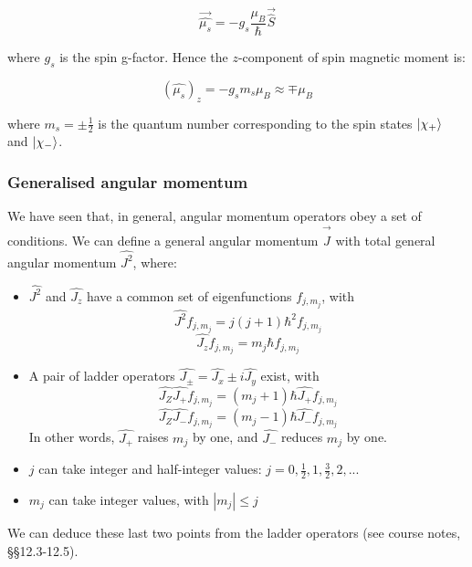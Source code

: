 \[ \vec{\hat{\mu_s}} = -g_s \frac{\mu_B}{\hbar} \vec{\hat{S}} \]

where $g_s$ is the spin g-factor. Hence the $z$-component of spin magnetic moment is:

\[ (\hat{\mu_s})_z = -g_s m_s \mu_B  \approx \mp \mu_B \]

where $m_s = \pm\frac{1}{2}$ is the quantum number corresponding to the spin states $\ket{\chi_+}$ and $\ket{\chi_-}$.

\subsubsection*{Generalised angular momentum}

We have seen that, in general, angular momentum operators obey a set of conditions. We can define a general angular momentum $\vec{\hat{J}}$ with total general angular momentum $\hat{J^2}$, where:

\begin{itemize}
	\item $\hat{J^2}$ and $\hat{J_z}$ have a common set of eigenfunctions $f_{j,m_j}$, with \[ \hat{J^2}f_{j,m_j} = j(j+1)\hbar^2 f_{j,m_j} \] \[ \hat{J_z}f_{j,m_j} = m_j\hbar f_{j,m_j} \]
	\item A pair of ladder operators $\hat{J_\pm} = \hat{J_x} \pm i\hat{J_y}$ exist, with \[ \hat{J_Z}\hat{J_+}f_{j,m_j} = (m_j + 1)\hbar \hat{J_+} f_{j,m_j} \] \[ \hat{J_Z}\hat{J_-}f_{j,m_j} = (m_j - 1)\hbar \hat{J_-} f_{j,m_j} \] In other words, $\hat{J_+}$ raises $m_j$ by one, and $\hat{J_-}$ reduces $m_j$ by one.
	\item $j$ can take integer and half-integer values: $j = 0, \frac{1}{2}, 1, \frac{3}{2}, 2, ...$
	\item $m_j$ can take integer values, with $|m_j| \leq j$
\end{itemize}

We can deduce these last two points from the ladder operators (see course notes, §§12.3-12.5).